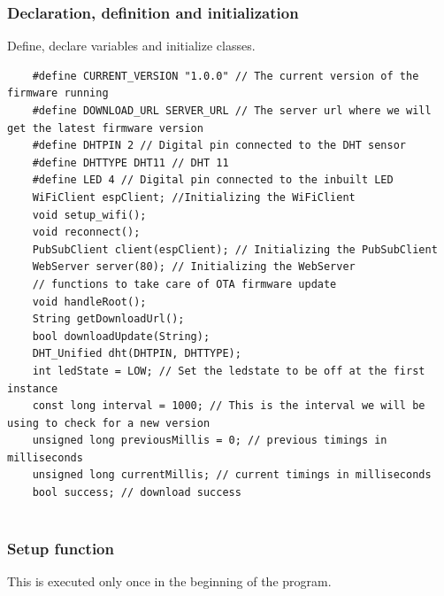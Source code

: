 \subsubsection{Declaration, definition and initialization}

Define, declare variables and initialize classes. 

\begin{lstlisting}
	#define CURRENT_VERSION "1.0.0" // The current version of the firmware running
	#define DOWNLOAD_URL SERVER_URL // The server url where we will get the latest firmware version
	#define DHTPIN 2 // Digital pin connected to the DHT sensor
	#define DHTTYPE DHT11 // DHT 11
	#define LED 4 // Digital pin connected to the inbuilt LED
	WiFiClient espClient; //Initializing the WiFiClient
	void setup_wifi();
	void reconnect();
	PubSubClient client(espClient); // Initializing the PubSubClient
	WebServer server(80); // Initializing the WebServer
	// functions to take care of OTA firmware update
	void handleRoot();
	String getDownloadUrl();
	bool downloadUpdate(String);
	DHT_Unified dht(DHTPIN, DHTTYPE);
	int ledState = LOW; // Set the ledstate to be off at the first instance
	const long interval = 1000; // This is the interval we will be using to check for a new version
	unsigned long previousMillis = 0; // previous timings in milliseconds
	unsigned long currentMillis; // current timings in milliseconds
	bool success; // download success
	

\end{lstlisting}
	

\subsubsection{Setup function}
This is  executed only once in the beginning of the program.


